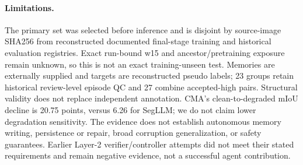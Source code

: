 \paragraph{Limitations.}
The primary set was selected before inference and is disjoint by source-image
SHA256 from reconstructed documented final-stage training and historical
evaluation registries. Exact run-bound w15 and ancestor/pretraining exposure
remain unknown, so this is not an exact training-unseen test.
Memories are externally supplied and targets are reconstructed pseudo labels;
23 groups retain historical review-level episode QC and 27 combine accepted-high
pairs. Structural validity does not replace independent annotation.
CMA's clean-to-degraded mIoU decline is 20.75 points, versus 6.26 for SegLLM;
we do not claim lower degradation sensitivity.
The evidence does not establish autonomous memory writing, persistence or repair,
broad corruption generalization, or safety guarantees. Earlier Layer-2
verifier/controller attempts did not meet their stated requirements and remain
negative evidence, not a successful agent contribution.
